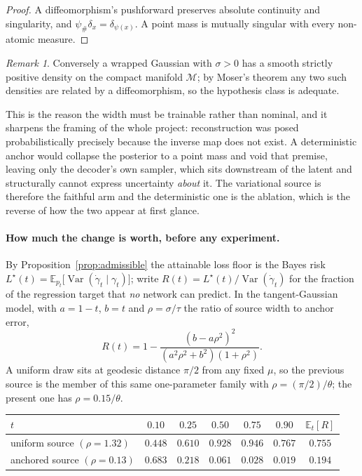 \documentclass[11pt,a4paper]{article}
\newcommand{\E}{\mathbb{E}}
\theoremstyle{plain}
\theoremstyle{remark}
\newtheorem*{remark}{Remark}
\begin{document}
\begin{proof}
A diffeomorphism's pushforward preserves absolute continuity and singularity,
and $\psi_\#\delta_x=\delta_{\psi(x)}$. A point mass is mutually singular with
every non-atomic measure.
\end{proof}

\begin{remark}
Conversely a wrapped Gaussian with $\sigma>0$ has a smooth strictly positive
density on the compact manifold $\mathcal{M}$; by Moser's theorem any two such
densities are related by a diffeomorphism, so the hypothesis class is adequate.
\end{remark}

\noindent
This is the reason the width must be trainable rather than nominal, and it
sharpens the framing of the whole project: reconstruction was posed
probabilistically precisely because the inverse map does not exist. A
deterministic anchor would collapse the posterior to a point mass and void that
premise, leaving only the decoder's own sampler, which sits downstream of the
latent and structurally cannot express uncertainty \emph{about} it. The
variational source is therefore the faithful arm and the deterministic one is
the ablation, which is the reverse of how the two appear at first glance.

\paragraph{How much the change is worth, before any experiment.}
By Proposition~\ref{prop:admissible} the attainable loss floor is the Bayes risk
$L^\star(t)=\E_{p_t}\!\big[\operatorname{Var}(\dot\gamma_t\mid\gamma_t)\big]$;
write $R(t)=L^\star(t)/\operatorname{Var}(\dot\gamma_t)$ for the fraction of the
regression target that \emph{no} network can predict. In the tangent-Gaussian
model, with $a=1-t$, $b=t$ and $\rho=\sigma/\tau$ the ratio of source width to
anchor error,
\begin{equation}
R(t)=1-\frac{(b-a\rho^2)^2}{(a^2\rho^2+b^2)(1+\rho^2)} .
\end{equation}
A uniform draw sits at geodesic distance $\pi/2$ from any fixed $\mu$, so the
previous source is the member of this same one-parameter family with
$\rho=(\pi/2)/\theta$; the present one has $\rho=0.15/\theta$.

\begin{center}
\footnotesize
\begin{tabular}{@{}lcccccc@{}}
\toprule
$t$ & $0.10$ & $0.25$ & $0.50$ & $0.75$ & $0.90$ & $\E_t[R]$ \\
\midrule
uniform source $(\rho=1.32)$ & $0.448$ & $0.610$ & $0.928$ & $0.946$ & $0.767$ & $\mathbf{0.755}$ \\
anchored source $(\rho=0.13)$ & $0.683$ & $0.218$ & $0.061$ & $0.028$ & $0.019$ & $\mathbf{0.194}$ \\
\bottomrule
\end{tabular}
\end{center}
\end{document}
